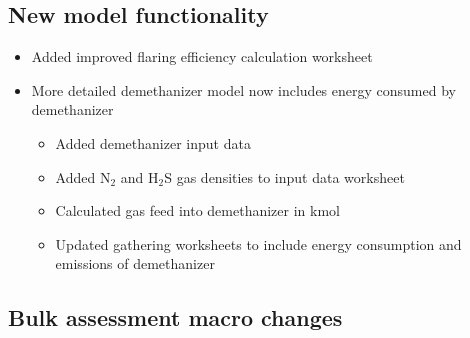 \documentclass[11pt]{report}
\begin{document}
{{{{\subsection{New model functionality}
\begin{itemize}
\item Added improved flaring efficiency calculation worksheet
\item{More detailed demethanizer model now includes energy consumed by demethanizer}
\begin{itemize}
\item{Added demethanizer input data}
\item{Added N$_2$ and H$_2$S gas densities to input data worksheet}
\item{Calculated gas feed into demethanizer in kmol}
\item{Updated gathering worksheets to include energy consumption and emissions of demethanizer}
\end{itemize}
\end{itemize}

\subsection{Bulk assessment macro changes}

}}}}
\end{document}
